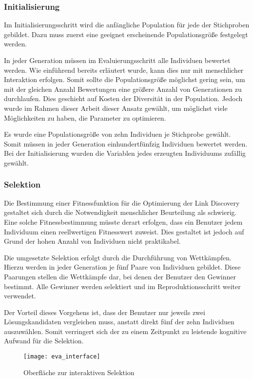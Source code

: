 \subsubsection{Initialisierung}

Im Initialisierungsschritt wird die anfängliche Population für jede der Stichproben gebildet. Dazu muss zuerst eine geeignet erscheinende Populationsgröße festgelegt werden.

In jeder Generation müssen im Evaluierungsschritt alle Individuen bewertet werden. Wie einführend bereits erläutert wurde, kann dies nur mit menschlicher Interaktion erfolgen. Somit sollte die Populationsgröße möglichst gering sein, um mit der gleichen Anzahl Bewertungen eine größere Anzahl von Generationen zu durchlaufen. Dies geschieht auf Kosten der Diversität in der Population. Jedoch wurde im Rahmen dieser Arbeit dieser Ansatz gewählt, um möglichst viele Möglichkeiten zu haben, die Parameter zu optimieren.

Es wurde eine Populationsgröße von zehn Individuen je Stichprobe gewählt. Somit müssen in jeder Generation einhundertfünfzig Individuen bewertet werden. Bei der Initialisierung wurden die Variablen jedes erzeugten Individuums zufällig gewählt.

\subsubsection{Selektion}

Die Bestimmung einer Fitnessfunktion für die Optimierung der Link Discovery gestaltet sich durch die Notwendigkeit menschlicher Beurteilung als schwierig. Eine solche Fitnessbestimmung müsste derart erfolgen, dass ein Benutzer jedem Individuum einen reellwertigen Fitnesswert zuweist. Dies gestaltet ist jedoch auf Grund der hohen Anzahl von Individuen nicht praktikabel.

Die umgesetzte Selektion erfolgt durch die Durchführung von Wettkämpfen. Hierzu werden in jeder Generation je fünf Paare von Individuen gebildet. Diese Paarungen stellen die Wettkämpfe dar, bei denen der Benutzer den Gewinner bestimmt. Alle Gewinner werden selektiert und im Reproduktionsschritt weiter verwendet.

Der Vorteil dieses Vorgehens ist, dass der Benutzer nur jeweils zwei Lösungskandidaten vergleichen muss, anstatt direkt fünf der zehn Individuen auszuwählen. Somit verringert sich der zu einem Zeitpunkt zu leistende kognitive Aufwand für die Selektion.

\begin{figure}
\centering
\texttt{[image: eva\_interface]}
\caption{Oberfläche zur interaktiven Selektion}
\label{fig:eva_interface}
\end{figure}

